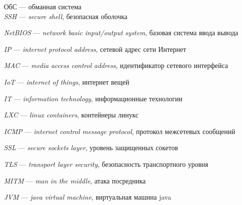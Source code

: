 
ОбС — обманная система \hspace*{\fill} \\

\textit{SSH} — \textit{secure shell}, безопасная оболочка

\textit{NetBIOS} — \textit{network basic input/output system}, базовая система ввода вывода

\textit{IP} — \textit{internet protocol address}, сетевой адрес сети Интернет

\textit{MAC} — \textit{media access control address}, идентификатор сетевого интерфейса

\textit{IoT} — \textit{internet of things}, интернет вещей

\textit{IT} — \textit{information technology}, информационные технологии

\textit{LXC} — \textit{linux containers}, контейнеры линукс

\textit{ICMP} — \textit{internet control message protocol}, протокол межсетевых сообщений

\textit{SSL} — \textit{secure sockets layer}, уровень защищенных сокетов

\textit{TLS} — \textit{transport layer security}, безопасность транспортного уровня

\textit{MITM} — \textit{man in the middle}, атака посредника

\textit{JVM} — \textit{java virtual machine}, виртуальная машина java